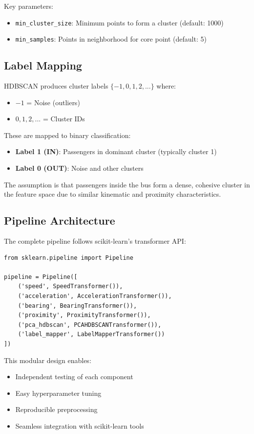 Key parameters:
\begin{itemize}
    \item \texttt{min\_cluster\_size}: Minimum points to form a cluster (default: 1000)
    \item \texttt{min\_samples}: Points in neighborhood for core point (default: 5)
\end{itemize}

\subsection{Label Mapping}

HDBSCAN produces cluster labels $\{-1, 0, 1, 2, ...\}$ where:
\begin{itemize}
    \item $-1$ = Noise (outliers)
    \item $0, 1, 2, ...$ = Cluster IDs
\end{itemize}

These are mapped to binary classification:
\begin{itemize}
    \item \textbf{Label 1 (IN)}: Passengers in dominant cluster (typically cluster 1)
    \item \textbf{Label 0 (OUT)}: Noise and other clusters
\end{itemize}

The assumption is that passengers inside the bus form a dense, cohesive cluster in the feature space due to similar kinematic and proximity characteristics.

\subsection{Pipeline Architecture}

The complete pipeline follows scikit-learn's transformer API:

\begin{lstlisting}[style=python, caption=Pipeline Structure]
from sklearn.pipeline import Pipeline

pipeline = Pipeline([
    ('speed', SpeedTransformer()),
    ('acceleration', AccelerationTransformer()),
    ('bearing', BearingTransformer()),
    ('proximity', ProximityTransformer()),
    ('pca_hdbscan', PCAHDBSCANTransformer()),
    ('label_mapper', LabelMapperTransformer())
])
\end{lstlisting}

This modular design enables:
\begin{itemize}
    \item Independent testing of each component
    \item Easy hyperparameter tuning
    \item Reproducible preprocessing
    \item Seamless integration with scikit-learn tools
\end{itemize}
